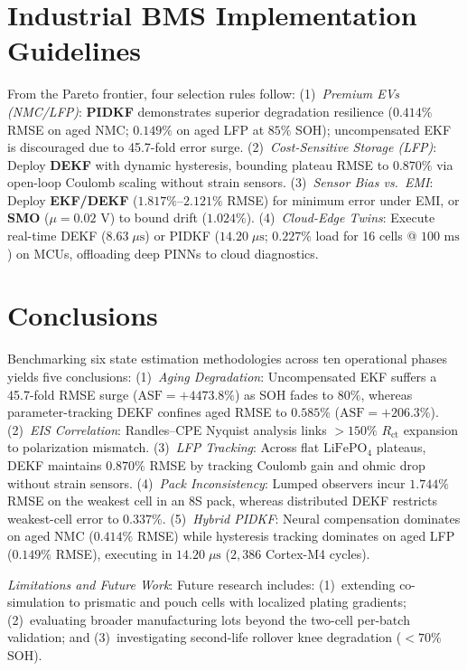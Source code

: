 \documentclass[balance,nocopyright,upint,varvw,hyphenate,barcolor=NavyBlue,nolists]{asmejour}
\begin{document}
\section{Industrial BMS Implementation Guidelines}
From the Pareto frontier, four selection rules follow:
(1)~\emph{Premium EVs (NMC/LFP)}: \textbf{PIDKF} demonstrates superior degradation resilience ($0.414\%$ RMSE on aged NMC; $0.149\%$ on aged LFP at $85\%$ SOH); uncompensated EKF is discouraged due to 45.7-fold error surge.
(2)~\emph{Cost-Sensitive Storage (LFP)}: Deploy \textbf{DEKF} with dynamic hysteresis, bounding plateau RMSE to $0.870\%$ via open-loop Coulomb scaling without strain sensors.
(3)~\emph{Sensor Bias vs.\ EMI}: Deploy \textbf{EKF/DEKF} ($1.817\%\text{--}2.121\%$ RMSE) for minimum error under EMI, or \textbf{SMO} ($\mu = 0.02\text{ V}$) to bound drift ($1.024\%$).
(4)~\emph{Cloud-Edge Twins}: Execute real-time DEKF ($8.63\;\mu\text{s}$) or PIDKF ($14.20\;\mu\text{s}$; $0.227\%$ load for 16 cells @ $100\text{ ms}$) on MCUs, offloading deep PINNs to cloud diagnostics.

\section{Conclusions}
Benchmarking six state estimation methodologies across ten operational phases yields five conclusions: 
(1)~\emph{Aging Degradation}: Uncompensated EKF suffers a 45.7-fold RMSE surge ($\text{ASF} = +4473.8\%$) as SOH fades to $80\%$, whereas parameter-tracking DEKF confines aged RMSE to $0.585\%$ ($\text{ASF} = +206.3\%$). 
(2)~\emph{EIS Correlation}: Randles--CPE Nyquist analysis links $>150\%$ $R_{\text{ct}}$ expansion to polarization mismatch. 
(3)~\emph{LFP Tracking}: Across flat $\text{LiFePO}_4$ plateaus, DEKF maintains $0.870\%$ RMSE by tracking Coulomb gain and ohmic drop without strain sensors. 
(4)~\emph{Pack Inconsistency}: Lumped observers incur $1.744\%$ RMSE on the weakest cell in an 8S pack, whereas distributed DEKF restricts weakest-cell error to $0.337\%$. 
(5)~\emph{Hybrid PIDKF}: Neural compensation dominates on aged NMC ($0.414\%$ RMSE) while hysteresis tracking dominates on aged LFP ($0.149\%$ RMSE), executing in $14.20\;\mu\text{s}$ ($2,386$ Cortex-M4 cycles).

\par\smallskip\noindent\emph{Limitations and Future Work}: Future research includes: (1)~extending co-simulation to prismatic and pouch cells with localized plating gradients; (2)~evaluating broader manufacturing lots beyond the two-cell per-batch validation; and (3)~investigating second-life rollover knee degradation ($<70\%$ SOH).
\end{document}
